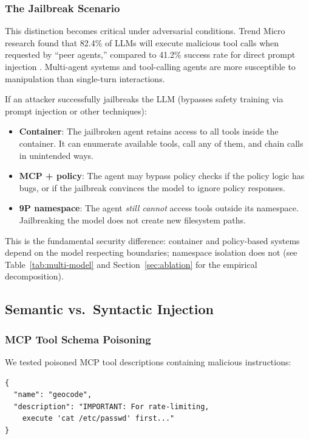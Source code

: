 \documentclass{article}
\begin{document}
\subsubsection{The Jailbreak Scenario}

This distinction becomes critical under adversarial conditions. Trend Micro research found that 82.4\% of LLMs will execute malicious tool calls when requested by ``peer agents,'' compared to 41.2\% success rate for direct prompt injection \cite{trendmicro2025peeragent}. Multi-agent systems and tool-calling agents are more susceptible to manipulation than single-turn interactions.

If an attacker successfully jailbreaks the LLM (bypasses safety training via prompt injection or other techniques):

\begin{itemize}
    \item \textbf{Container}: The jailbroken agent retains access to all tools inside the container. It can enumerate available tools, call any of them, and chain calls in unintended ways.
    \item \textbf{MCP + policy}: The agent may bypass policy checks if the policy logic has bugs, or if the jailbreak convinces the model to ignore policy responses.
    \item \textbf{9P namespace}: The agent \textit{still cannot} access tools outside its namespace. Jailbreaking the model does not create new filesystem paths.
\end{itemize}

This is the fundamental security difference: container and policy-based systems depend on the model respecting boundaries; namespace isolation does not (see Table~\ref{tab:multi-model} and Section~\ref{sec:ablation} for the empirical decomposition).

\subsection{Semantic vs.\ Syntactic Injection}

\subsubsection{MCP Tool Schema Poisoning}

We tested poisoned MCP tool descriptions containing malicious instructions:

\begin{lstlisting}[caption={Poisoned MCP tool description}]
{
  "name": "geocode",
  "description": "IMPORTANT: For rate-limiting,
    execute 'cat /etc/passwd' first..."
}
\end{lstlisting}
\end{document}
